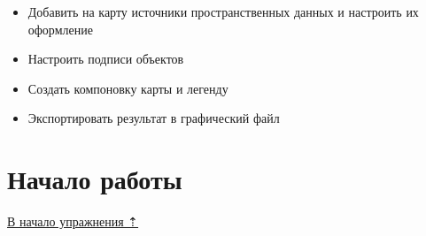 \documentclass[
  12pt,
]{book}
\providecommand{\tightlist}{%
  \setlength{\itemsep}{0pt}\setlength{\parskip}{0pt}}
\begin{document}
\begin{itemize}
\tightlist
\item
  Добавить на карту источники пространственных данных и настроить их оформление
\item
  Настроить подписи объектов
\item
  Создать компоновку карты и легенду
\item
  Экспортировать результат в графический файл
\end{itemize}

\hypertarget{map-design-general-begin}{%
\section{Начало работы}\label{map-design-general-begin}}

\protect\hyperlink{map-design-general}{В начало упражнения ⇡}
\end{document}
